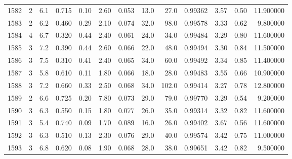 \begin{tabular}{lrrrrrrrrrrrr}
1582 &        2 &            6.1 &             0.715 &         0.10 &            2.60 &      0.053 &                 13.0 &                  27.0 &  0.99362 &  3.57 &       0.50 &  11.900000 \\
1583 &        2 &            6.2 &             0.460 &         0.29 &            2.10 &      0.074 &                 32.0 &                  98.0 &  0.99578 &  3.33 &       0.62 &   9.800000 \\
1584 &        4 &            6.7 &             0.320 &         0.44 &            2.40 &      0.061 &                 24.0 &                  34.0 &  0.99484 &  3.29 &       0.80 &  11.600000 \\
1585 &        3 &            7.2 &             0.390 &         0.44 &            2.60 &      0.066 &                 22.0 &                  48.0 &  0.99494 &  3.30 &       0.84 &  11.500000 \\
1586 &        3 &            7.5 &             0.310 &         0.41 &            2.40 &      0.065 &                 34.0 &                  60.0 &  0.99492 &  3.34 &       0.85 &  11.400000 \\
1587 &        3 &            5.8 &             0.610 &         0.11 &            1.80 &      0.066 &                 18.0 &                  28.0 &  0.99483 &  3.55 &       0.66 &  10.900000 \\
1588 &        3 &            7.2 &             0.660 &         0.33 &            2.50 &      0.068 &                 34.0 &                 102.0 &  0.99414 &  3.27 &       0.78 &  12.800000 \\
1589 &        2 &            6.6 &             0.725 &         0.20 &            7.80 &      0.073 &                 29.0 &                  79.0 &  0.99770 &  3.29 &       0.54 &   9.200000 \\
1590 &        3 &            6.3 &             0.550 &         0.15 &            1.80 &      0.077 &                 26.0 &                  35.0 &  0.99314 &  3.32 &       0.82 &  11.600000 \\
1591 &        3 &            5.4 &             0.740 &         0.09 &            1.70 &      0.089 &                 16.0 &                  26.0 &  0.99402 &  3.67 &       0.56 &  11.600000 \\
1592 &        3 &            6.3 &             0.510 &         0.13 &            2.30 &      0.076 &                 29.0 &                  40.0 &  0.99574 &  3.42 &       0.75 &  11.000000 \\
1593 &        3 &            6.8 &             0.620 &         0.08 &            1.90 &      0.068 &                 28.0 &                  38.0 &  0.99651 &  3.42 &       0.82 &   9.500000 \\

\end{tabular}
